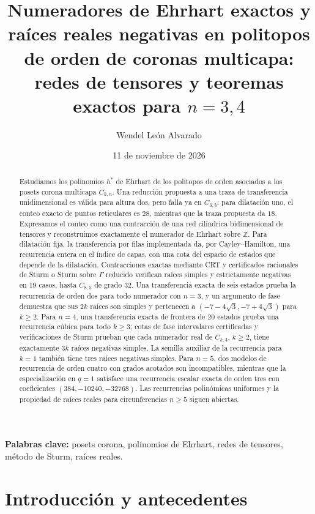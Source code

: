 \documentclass[11pt,a4paper]{article}
\title{Numeradores de Ehrhart exactos y raíces reales negativas en politopos de orden de coronas multicapa: redes de tensores y teoremas exactos para $n=3,4$}
\author{Wendel León Alvarado}
\date{11 de noviembre de 2026}
\theoremstyle{definition}
\begin{document}
\maketitle

\begin{abstract}
Estudiamos los polinomios $h^*$ de Ehrhart de los politopos de orden asociados a los posets corona multicapa $C_{k,n}$. Una reducción propuesta a una traza de transferencia unidimensional es válida para altura dos, pero falla ya en $C_{3,3}$: para dilatación uno, el conteo exacto de puntos reticulares es $28$, mientras que la traza propuesta da $18$. Expresamos el conteo como una contracción de una red cilíndrica bidimensional de tensores y reconstruimos exactamente el numerador de Ehrhart sobre $\mathbb{Z}$. Para dilatación fija, la transferencia por filas implementada da, por Cayley--Hamilton, una recurrencia entera en el índice de capas, con una cota del espacio de estados que depende de la dilatación. Contracciones exactas mediante CRT y certificados racionales de Sturm o Sturm sobre $\Gamma$ reducido verifican raíces simples y estrictamente negativas en 19 casos, hasta $C_{8,5}$ de grado 32. Una transferencia exacta de seis estados prueba la recurrencia de orden dos para todo numerador con $n=3$, y un argumento de fase demuestra que sus $2k$ raíces son simples y pertenecen a $(-7-4\sqrt3,-7+4\sqrt3)$ para $k\ge2$. Para $n=4$, una transferencia exacta de frontera de 20 estados prueba una recurrencia cúbica para todo $k\ge3$; cotas de fase intervalares certificadas y verificaciones de Sturm prueban que cada numerador real de $C_{k,4}$, $k\ge2$, tiene exactamente $3k$ raíces negativas simples. La semilla auxiliar de la recurrencia para $k=1$ también tiene tres raíces negativas simples. Para $n=5$, dos modelos de recurrencia de orden cuatro con grados acotados son incompatibles, mientras que la especialización en $q=1$ satisface una recurrencia escalar exacta de orden tres con coeficientes $(384,-10240,-32768)$. Las recurrencias polinómicas uniformes y la propiedad de raíces reales para circunferencias $n\ge5$ siguen abiertas.
\end{abstract}

\small\noindent\textbf{Palabras clave:} posets corona, polinomios de Ehrhart, redes de tensores, método de Sturm, raíces reales.
\normalsize

\section{Introducción y antecedentes}
\end{document}
